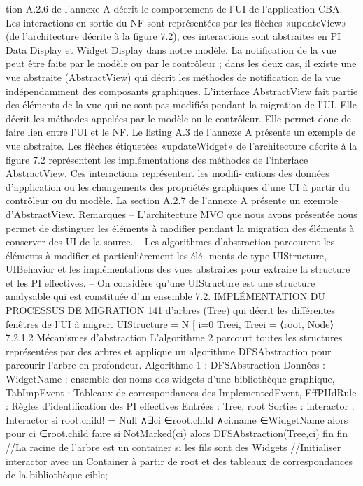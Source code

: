 \documentclass{article}
\begin{document}
tion A.2.6 de l’annexe A décrit le comportement de l’UI de l’application CBA.
Les interactions en sortie du NF sont représentées par les ﬂèches «updateView» (de l’architecture
décrite à la ﬁgure 7.2), ces interactions sont abstraites en PI Data Display et Widget Display dans
notre modèle. La notiﬁcation de la vue peut être faite par le modèle ou par le contrôleur ; dans les
deux cas, il existe une vue abstraite (AbstractView) qui décrit les méthodes de notiﬁcation de la vue
indépendamment des composants graphiques.
L’interface AbstractView fait partie des éléments de la vue qui ne sont pas modiﬁés pendant la
migration de l’UI. Elle décrit les méthodes appelées par le modèle ou le contrôleur. Elle permet donc
de faire lien entre l’UI et le NF. Le listing A.3 de l’annexe A présente un exemple de vue abstraite.
Les ﬂèches étiquetées «updateWidget» de l’architecture décrite à la ﬁgure 7.2 représentent les
implémentations des méthodes de l’interface AbstractView. Ces interactions représentent les modiﬁ-
cations des données d’application ou les changements des propriétés graphiques d’une UI à partir du
contrôleur ou du modèle. La section A.2.7 de l’annexe A présente un exemple d’AbstractView.
Remarques
– L’architecture MVC que nous avons présentée nous permet de distinguer les éléments à modiﬁer
pendant la migration des éléments à conserver des UI de la source.
– Les algorithmes d’abstraction parcourent les éléments à modiﬁer et particulièrement les élé-
ments de type UIStructure, UIBehavior et les implémentations des vues abstraites pour extraire
la structure et les PI effectives.
– On considère qu’une UIStructure est une structure analysable qui est constituée d’un ensemble
7.2. IMPLÉMENTATION DU PROCESSUS DE MIGRATION
141
d’arbres (Tree) qui décrit les différentes fenêtres de l’UI à migrer.
UIStructure =
N
[
i=0
Treei, Treei = ⟨root, Node⟩
7.2.1.2
Mécanismes d’abstraction
L’algorithme 2 parcourt toutes les structures représentées par des arbres et applique un algorithme
DFSAbstraction pour parcourir l’arbre en profondeur.
Algorithme 1 : DFSAbstraction
Données : WidgetName : ensemble des noms des widgets d’une bibliothèque graphique,
TabImpEvent : Tableaux de correspondances des ImplementedEvent, EffPIIdRule :
Règles d’identiﬁcation des PI effectives
Entrées : Tree, root
Sorties : interactor : Interactor
si root.child! = Null ∧∃ci ∈root.child ∧ci.name ∈WidgetName alors
pour ci ∈root.child faire
si NotMarked(ci) alors
DFSAbstraction(Tree,ci)
ﬁn
ﬁn
//La racine de l’arbre est un container si les ﬁls sont des Widgets //Initialiser interactor avec
un Container à partir de root et des tableaux de correspondances de la bibliothèque cible;
\end{document}
